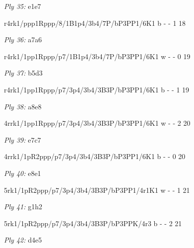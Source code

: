 \documentclass{article}
\begin{document}
\bigskip

\emph{Ply 35:} e1e7


r4rk1/ppp1Rppp/8/1B1p4/3b4/7P/bP3PP1/6K1 b - - 1 18


\showboard

\bigskip

\emph{Ply 36:} a7a6

r4rk1/1pp1Rppp/p7/1B1p4/3b4/7P/bP3PP1/6K1 w - - 0 19


\showboard

\bigskip

\emph{Ply 37:} b5d3


r4rk1/1pp1Rppp/p7/3p4/3b4/3B3P/bP3PP1/6K1 b - - 1 19


\showboard

\bigskip

\emph{Ply 38:} a8e8

4rrk1/1pp1Rppp/p7/3p4/3b4/3B3P/bP3PP1/6K1 w - - 2 20


\showboard

\bigskip

\emph{Ply 39:} e7c7


4rrk1/1pR2ppp/p7/3p4/3b4/3B3P/bP3PP1/6K1 b - - 0 20


\showboard

\bigskip

\emph{Ply 40:} e8e1

5rk1/1pR2ppp/p7/3p4/3b4/3B3P/bP3PP1/4r1K1 w - - 1 21


\showboard

\bigskip

\emph{Ply 41:} g1h2


5rk1/1pR2ppp/p7/3p4/3b4/3B3P/bP3PPK/4r3 b - - 2 21


\showboard

\bigskip

\emph{Ply 42:} d4e5
\end{document}
